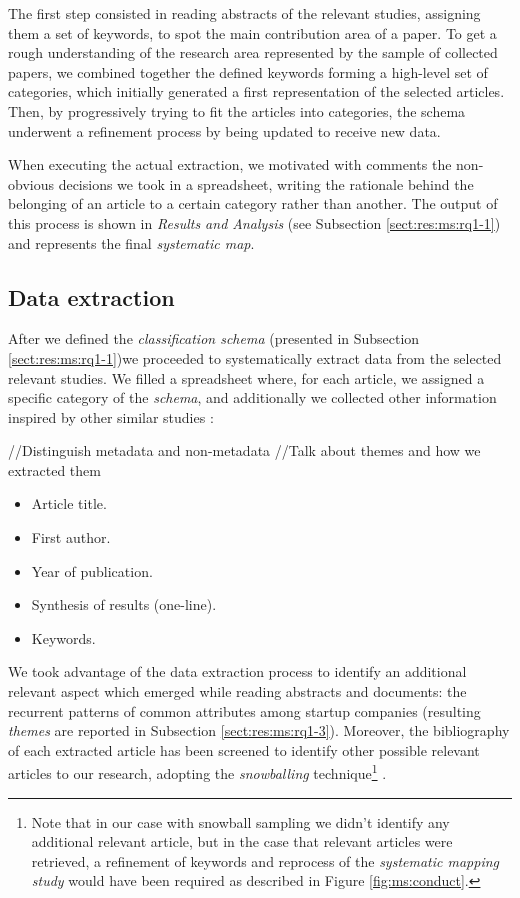 \documentclass[final,5p,times,twocolumn]{elsarticle}
\begin{document}
The first step consisted in reading abstracts of the relevant studies, assigning them a set of keywords, to spot the main contribution area of a paper. To get a rough understanding of the research area represented by the sample of collected papers, we combined together the defined keywords forming a high-level set of categories, which initially generated a first representation of the selected articles. Then, by progressively trying to fit the articles into categories, the schema underwent a refinement process by being updated to receive new data.

When executing the actual extraction, we motivated with comments the non-obvious decisions we took in a spreadsheet, writing the rationale behind the belonging of an article to a certain category rather than another. The output of this process is shown in \textit{Results and Analysis} (see Subsection \ref{sect:res:ms:rq1-1}) and represents the final \textit{systematic map}. 


\subsection{Data extraction} %
\label{sub:data_extraction}

After we defined the \textit{classification schema} (presented in Subsection \ref{sect:res:ms:rq1-1})we proceeded to systematically extract data from the selected relevant studies.  We filled a spreadsheet where, for each article, we assigned a specific category of the \textit{schema}, and additionally we collected other information inspired by other similar studies \cite{Dyba2008, Shepperd2007}:

//Distinguish metadata and non-metadata
//Talk about themes and how we extracted them


\begin{itemize}

\item Article title.
\item First author.
\item Year of publication.
\item Synthesis of results (one-line).
\item Keywords.
\end {itemize}

We took advantage of the data extraction process to identify an additional relevant aspect which emerged while reading abstracts and documents:  the recurrent patterns of common attributes among startup companies (resulting \textit{themes} are reported in Subsection \ref{sect:res:ms:rq1-3}). Moreover, the bibliography of each extracted article has been screened to identify other possible relevant articles to our research, adopting the \textit{snowballing} technique\footnote{Note that in our case with snowball sampling we didn’t identify any additional relevant article, but in the case that relevant articles were retrieved, a refinement of keywords and reprocess of the \textit{systematic mapping study} would have been required as described in Figure \ref{fig:ms:conduct}.} \cite{snowballing}. 
\end{document}
